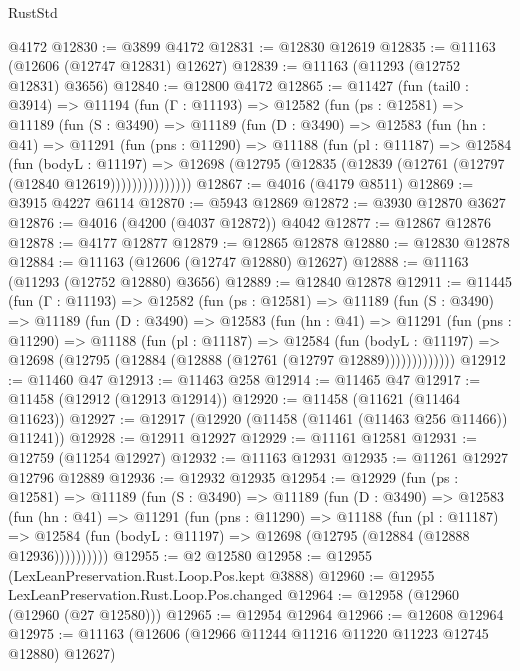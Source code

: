 \begin{lexlean}{RustStd}
\begin{coremodule}
    @4172
@12830 := @3899 @4172
@12831 := @12830 @12619
@12835 := @11163 (@12606 (@12747 @12831) @12627)
@12839 := @11163 (@11293 (@12752 @12831) @3656)
@12840 := @12800 @4172
@12865 := @11427
    (fun (tail0 : @3914) =>
    @11194
      (fun (Γ : @11193) =>
      @12582
        (fun (ps : @12581) =>
        @11189
          (fun (S : @3490) =>
          @11189
            (fun (D : @3490) =>
            @12583
              (fun (hn : @41) =>
              @11291
                (fun (pns : @11290) =>
                @11188
                  (fun (pl : @11187) =>
                  @12584
                    (fun (bodyL : @11197) =>
                    @12698 (@12795 (@12835 (@12839 (@12761 (@12797 (@12840 @12619)))))))))))))))
@12867 := @4016 (@4179 @8511)
@12869 := @3915 @4227 @6114
@12870 := @5943 @12869
@12872 := @3930 @12870 @3627
@12876 := @4016 (@4200 (@4037 @12872)) @4042
@12877 := @12867 @12876
@12878 := @4177 @12877
@12879 := @12865 @12878
@12880 := @12830 @12878
@12884 := @11163 (@12606 (@12747 @12880) @12627)
@12888 := @11163 (@11293 (@12752 @12880) @3656)
@12889 := @12840 @12878
@12911 := @11445
    (fun (Γ : @11193) =>
    @12582
      (fun (ps : @12581) =>
      @11189
        (fun (S : @3490) =>
        @11189
          (fun (D : @3490) =>
          @12583
            (fun (hn : @41) =>
            @11291
              (fun (pns : @11290) =>
              @11188
                (fun (pl : @11187) =>
                @12584
                  (fun (bodyL : @11197) =>
                  @12698 (@12795 (@12884 (@12888 (@12761 (@12797 @12889)))))))))))))
@12912 := @11460 @47
@12913 := @11463 @258
@12914 := @11465 @47
@12917 := @11458 (@12912 (@12913 @12914))
@12920 := @11458 (@11621 (@11464 @11623))
@12927 := @12917 (@12920 (@11458 (@11461 (@11463 @256 @11466)) @11241))
@12928 := @12911 @12927
@12929 := @11161 @12581
@12931 := @12759 (@11254 @12927)
@12932 := @11163 @12931
@12935 := @11261 @12927 @12796 @12889
@12936 := @12932 @12935
@12954 := @12929
    (fun (ps : @12581) =>
    @11189
      (fun (S : @3490) =>
      @11189
        (fun (D : @3490) =>
        @12583
          (fun (hn : @41) =>
          @11291
            (fun (pns : @11290) =>
            @11188
              (fun (pl : @11187) =>
              @12584 (fun (bodyL : @11197) => @12698 (@12795 (@12884 (@12888 @12936))))))))))
@12955 := @2 @12580
@12958 := @12955 (LexLeanPreservation.Rust.Loop.Pos.kept @3888)
@12960 := @12955 LexLeanPreservation.Rust.Loop.Pos.changed
@12964 := @12958 (@12960 (@12960 (@27 @12580)))
@12965 := @12954 @12964
@12966 := @12608 @12964
@12975 := @11163 (@12606 (@12966 @11244 @11216 @11220 @11223 @12745 @12880) @12627)

\end{coremodule}
\end{lexlean}

